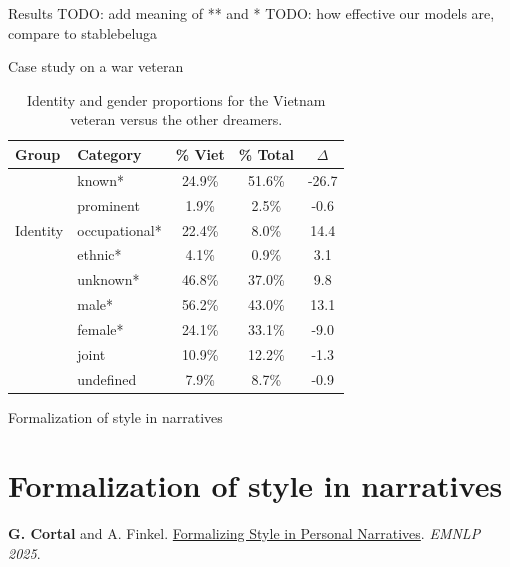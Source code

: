 \documentclass[handout,10pt]{beamer}
\begin{document}
\begin{frame}{Results}
TODO: add meaning of ** and *
TODO: how effective our models are, compare to stablebeluga

    
\end{frame}

\begin{frame}{Case study on a war veteran}
  \begin{table}
    \centering
    \begin{tabular}{llccc}
\textbf{Group} & \textbf{Category} & \textbf{\% Viet} & \textbf{\% Total} & \textbf{$\Delta$} \\
\midrule
\multirow{5}{*}{Identity} & known* & 24.9\% & 51.6\% & -26.7 \\
& prominent & 1.9\% & 2.5\% & -0.6 \\
& occupational* & 22.4\% & 8.0\% & 14.4 \\
& ethnic* & 4.1\% & 0.9\% & 3.1 \\
& unknown* & 46.8\% & 37.0\% & 9.8 \\
\addlinespace
\multirow{4}{*}{Gender} & male* & 56.2\% & 43.0\% & 13.1 \\
& female* & 24.1\% & 33.1\% & -9.0 \\
& joint & 10.9\% & 12.2\% & -1.3 \\
& undefined & 7.9\% & 8.7\% & -0.9 \\
\end{tabular}
\caption{Identity and gender proportions for the Vietnam veteran versus the other dreamers.}%
\label{tab:case_study_war_veteran}
\end{table}
\end{frame}


\begin{frame}{}
\Large
\begin{center}
    Formalization of style in narratives
    \section{Formalization of style in narratives}
\end{center}

\vspace{1.5cm}

\footnotesize

\textbf{G. Cortal} and A. Finkel. \href{https://gustavecortal.com/data/Formalizing_Style_in_Personal_Narratives.pdf}{Formalizing Style in Personal Narratives}. \textit{EMNLP 2025}.
\end{frame}
\end{document}
